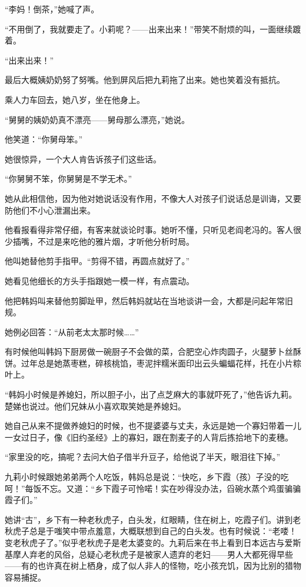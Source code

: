 \par “李妈！倒茶，”她喊了声。
\par “不用倒了，我就要走了。小莉呢？——出来出来！”带笑不耐烦的叫，一面继续踱着。
\par “出来出来！”
\par 最后大概姨奶奶努了努嘴。他到屏风后把九莉拖了出来。她也笑着没有抵抗。
\par 乘人力车回去，她八岁，坐在他身上。
\par “舅舅的姨奶奶真不漂亮——舅母那么漂亮，”她说。
\par 他笑道：“你舅母笨。”
\par 她很惊异，一个大人肯告诉孩子们这些话。
\par “你舅舅不笨，你舅舅是不学无术。”
\par 她从此相信他，因为他对她说话没有作用，不像大人对孩子们说话总是训诲，又要防他们不小心泄漏出来。
\par 他看报看得非常仔细，有客来就谈论时事。她听不懂，只听见老阎老冯的。客人很少插嘴，不过是来吃他的雅片烟，才听他分析时局。
\par 他叫她替他剪手指甲。“剪得不错，再圆点就好了。”
\par 她看见他细长的方头手指跟她一模一样，有点震动。
\par 他把韩妈叫来替他剪脚趾甲，然后韩妈就站在当地谈讲一会，大都是问起年常旧规。
\par 她例必回答：“从前老太太那时候……”
\par 有时候他叫韩妈下厨房做一碗厨子不会做的菜，合肥空心炸肉圆子，火腿萝卜丝酥饼。过年总是她蒸枣糕，碎核桃馅，枣泥拌糯米面印出云头蝙蝠花样，托在小片粽叶上。
\par “韩妈小时候是养媳妇，所以胆子小，出了点芝麻大的事就吓死了，”他告诉九莉。楚娣也说过。他们兄妹从小喜欢取笑她是养媳妇。
\par 她自己从来不提做养媳妇的时候，也不提婆婆与丈夫，永远是她一个寡妇带着一儿一女过日子，像《旧约圣经》上的寡妇，跟在割麦子的人背后拣拾地下的麦穗。
\par “家里没的吃，搞呢？去问大伯子借半升豆子，给他说了半天，眼泪往下掉。”
\par 九莉小时候跟她弟弟两个人吃饭，韩妈总是说：“快吃，乡下霞（孩）子没的吃呵！”每饭不忘。又道：“乡下霞子可怜喏！实在吵得没办法，舀碗水蒸个鸡蛋骗骗霞子们。”
\par 她讲“古”，乡下有一种老秋虎子，白头发，红眼睛，住在树上，吃霞子们。讲到老秋虎子总是于嗤笑中带点羞意，大概联想到自己的白头发。也有时候说：“老喽！变老秋虎子了。”似乎老秋虎子是老太婆变的。九莉后来在书上看到日本远古与爱斯基摩人弃老的风俗，总疑心老秋虎子是被家人遗弃的老妇——男人大都死得早些——有的也许真在树上栖身，成了似人非人的怪物，吃小孩充饥，因为比别的猎物容易捕捉。
